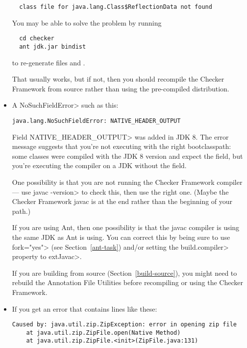 \begin{itemize}
\begin{Verbatim}
  class file for java.lang.Class$ReflectionData not found
\end{Verbatim}

You may be able to solve the problem by running

\begin{Verbatim}
  cd checker
  ant jdk.jar bindist
\end{Verbatim}

\noindent
to re-generate files  and .

That usually works, but if not, then you should recompile the Checker
Framework from source rather than using the pre-compiled distribution.


\item
A \<NoSuchFieldError> such as this:

\begin{Verbatim}
java.lang.NoSuchFieldError: NATIVE_HEADER_OUTPUT
\end{Verbatim}

\noindent
Field \<NATIVE\_HEADER\_OUTPUT> was added in JDK 8.
The error message suggests that
you're not executing with the right bootclasspath: some classes were
compiled with the JDK 8 version and expect the field, but you're
executing the compiler on a JDK without the field.

One possibility is that you are not running the Checker Framework compiler
--- use \<javac -version> to check this, then use the right one.  (Maybe
the Checker Framework javac is at the end rather than the beginning of your
path.)

If you are using Ant, then one possibility
is that the javac compiler is using the same JDK as Ant is using.  You can
correct this by being sure to use \<fork="yes"> (see
Section~\ref{ant-task}) and/or setting the \<build.compiler> property to
\<extJavac>.

If you are building from source  (Section~\ref{build-source}),
you might need to rebuild the Annotation
File Utilities before recompiling or using the Checker Framework.


\item
If you get an error that contains lines like these:

\begin{Verbatim}
Caused by: java.util.zip.ZipException: error in opening zip file
    at java.util.zip.ZipFile.open(Native Method)
    at java.util.zip.ZipFile.<init>(ZipFile.java:131)
\end{Verbatim}


\end{itemize}
